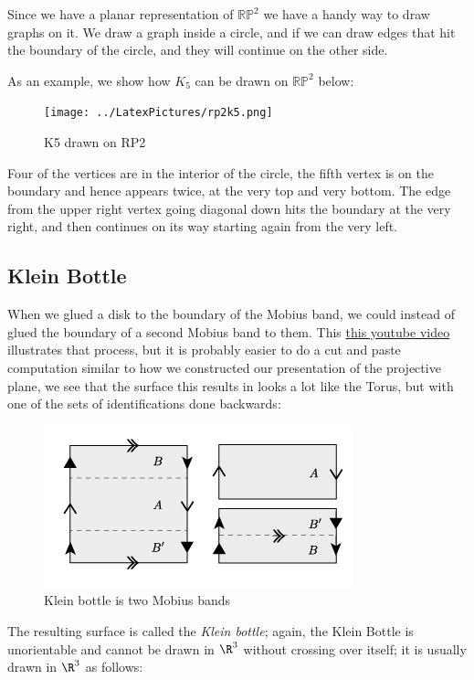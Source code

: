 \documentclass[]{article}
\begin{document}
Since we have a planar representation of \(\mathbb{RP}^2\) we have a
handy way to draw graphs on it. We draw a graph inside a circle, and if
we can draw edges that hit the boundary of the circle, and they will
continue on the other side.

As an example, we show how \(K_5\) can be drawn on \(\mathbb{RP}^2\)
below:

\begin{figure}[htbp]
\centering
\texttt{[image: ../LatexPictures/rp2k5.png]}
\caption{K5 drawn on RP2}
\end{figure}

Four of the vertices are in the interior of the circle, the fifth vertex
is on the boundary and hence appears twice, at the very top and very
bottom. The edge from the upper right vertex going diagonal down hits
the boundary at the very right, and then continues on its way starting
again from the very left.

\subsection{Klein Bottle}\label{klein-bottle}

When we glued a disk to the boundary of the Mobius band, we could
instead of glued the boundary of a second Mobius band to them. This
\href{https://www.youtube.com/watch?v=a5Azcwe9p4o}{this youtube video}
illustrates that process, but it is probably easier to do a cut and
paste computation similar to how we constructed our presentation of the
projective plane, we see that the surface this results in looks a lot
like the Torus, but with one of the sets of identifications done
backwards:

\begin{figure}[htbp]
\centering
\includegraphics{kleinto2moebius.png}
\caption{Klein bottle is two Mobius bands}
\end{figure}

The resulting surface is called the \emph{Klein bottle}; again, the
Klein Bottle is unorientable and cannot be drawn in \(\R^3\) without
crossing over itself; it is usually drawn in \(\R^3\) as follows:
\end{document}
